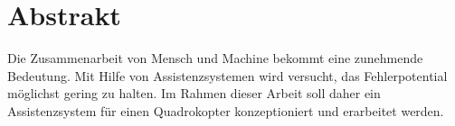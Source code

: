 \chapter*{Abstrakt} 
Die Zusammenarbeit von Mensch und Machine bekommt eine zunehmende Bedeutung. Mit Hilfe von Assistenzsystemen wird versucht, das Fehlerpotential möglichst gering zu halten. \newline
Im Rahmen dieser Arbeit soll daher ein Assistenzsystem für einen Quadrokopter konzeptioniert und erarbeitet werden. 
